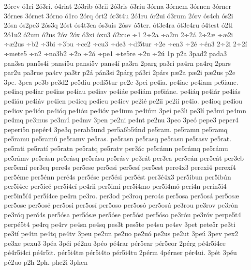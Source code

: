 {2^^f3rev
^^f31ri
2^^f33ri.
^^f34riat
2^^f33rib
^^f33rii
2^^f33ris
^^f33riu
3^^f3rna
3^^f3rnem
3^^f3rnen
3^^f3rner
3^^f3rnes
3^^f3rnet
3^^f3rno
^^f31ro
2^^f3rq
^^f3rt2
^^f3r3t4u
2^^f31ru
^^f3r2ui
^^f33rum
2^^f3rv
^^f3s4ch
^^f3s2i
2^^f3sn
^^f3s2pe3
2^^f3s3q
2^^f3st
^^f3s4t3ea
^^f3s3uis
2^^f3sv
^^f35ter.
^^f3t3e4ra
^^f3t3e4ru
^^f34test
^^f32tl
2^^f31u2
^^f32um
^^f32us
2^^f3v
2^^f3x
^^f33xi
^^f3xu3
^^f32xue
^^f71
2^^f72a
^^f7a2m
2^^f72^^e1
2^^f72^^e6
^^f7^^e62i
^^f7^^e62us
^^f7b2
^^f73bi
^^f73bu
^^f7ce2
^^f7cu3
^^f7de3
^^f7d^^ed5tur
^^f72e
^^f7en3
^^f72^^e9
^^f7^^e9n3
2^^f72i
2^^f72^^ed
^^f7mete5
^^f7n2
^^f7no3b2
^^f72o
^^f72^^f3
^^f7pe1
^^f7te5re
^^f72u
^^f72^^fa
1p
p2a
3pad2
pada3
pan3sa
pan5s4i
pansi5u
pansi5v
pans4^^ed
pa3ra
2parg
pa3ri
pa4rn
pa4rq
2pars
par2u
pa3rue
pa4rv
pa3tr
p2^^e1
p^^e1n3si
2p^^e1rg
p^^e13ri
2p^^e1rs
p^^e62a
p^^e62i
p^^e62us
p2e
3pe.
3pea
pe3b
pe3d2
pe5diu
ped^^ed5tur
pe2e
3pei
pe4ia.
pe4iae
pe4iam
pe6iane.
pe4iaq
pe4iar
pe4ias
pe4iau
pe4iav
pe4i^^e1e
pe4i^^e1m
pe6i^^e1ne.
pe4i^^e1q
pe4i^^e1r
pe4i^^e1s
pe4i^^e1u
pe4i^^e1v
pe4ien
pe4ieq
pe4ieu
pe4iev
pe2i^^e9
pe2ii
pe2i^^ed
pe4io.
pe4ioq
pe4iou
pe4iov
pe4i^^f3n
pe4i^^f3q
pe4i^^f3u
pe4i^^f3v
pe4ium
pe4i^^fam
3pe^^ed
pe3li
pe3l^^ed
pe3mi
pe4mn
pe4mq
pe3mus
pe3m^^fa
pe4mv
3pen
pe2ni
pe4nt
pe2nu
3peo
3pe^^f3
pepe3
peper4
peperi5n
pep^^e9r4
3pe3q
perab5und
per5a6b5^^fand
pe5ram.
pe5ramn
pe5ramq
pe5ramu
pe5ram^^fa
pe5ramv
pe5ras.
pe5rasn
pe5rasq
pe5rasu
pe5rasv
pe5rat.
pe5rati
pe5rat^^ed
pe5ratn
pe5ratq
pe5ratv
per3^^e1c
pe5r^^e1mn
pe5r^^e1mq
pe5r^^e1mu
pe5r^^e1mv
pe5r^^e1sn
pe5r^^e1sq
pe5r^^e1su
pe5r^^e1sv
pe3r^^e1t
per3ea
per5e^^e1n
per5e^^e1t
per3eb
per5em^^ed
per3eq
pere4s
per5ese
per5esi
per5es^^ed
per5est
pere4x3
perexi4
perex^^ed4
per5^^e9me
per5^^e9nn
per^^e94s
per5^^e9se
per5^^e9si
per5^^e9st
per3^^e94x3
per5ibun
per5ib^^fan
per5i4ce
per5ic^^e9
per5i4c^^ed
pe4rii
per5imi
per5i4mo
per5i4m^^f3
peri4n
perin5i4
per5in5^^ed4
per5^^ed4ce
pe4rn
pe3ro.
per3od
pe3roq
pero4s
per5osa
per5os^^e1
per5os^^e6
per5ose
per5os^^e9
per5osi
per5os^^ed
per5oso
per5os^^f3
per5os^^fa
pe3rou
pe3rov
pe3r^^f3n
pe3r^^f3q
per^^f34s
per5^^f3sa
per5^^f3s^^e6
per5^^f3se
per5^^f3si
per5^^f3so
pe3r^^f3u
pe3r^^f3v
perpe5t4
perp^^e95t4
pe4rq
pe4rv
pe4sn
pe4sq
pes3t
pes5te
pe4su
pe4sv
3pet
pete5r
pe3ti
pe3t^^ed
pe4tn
pe4tq
pe4tv
3peu
pe2un
pe2uo
pe2u^^f3
pe2us
pe2ut
3pe^^fa
3pev
pex2
pe3xe
pexu3
3p^^e9a
3p^^e9i
p^^e92nu
3p^^e9o
p^^e94rar
p^^e9r5ear
p^^e9r5eor
2p^^e9rg
p^^e94r5i4ce
p^^e94r5i4ci
p^^e94r5it.
p^^e9r5i4t^^e6
p^^e9r5i4to
p^^e9r5i4tu
2p^^e9rm
4p^^e9rner
p^^e9r4ui.
3p^^e9t
3p^^e9u
p^^e92uo
p2h
2ph.
phe2i
3phen
}
